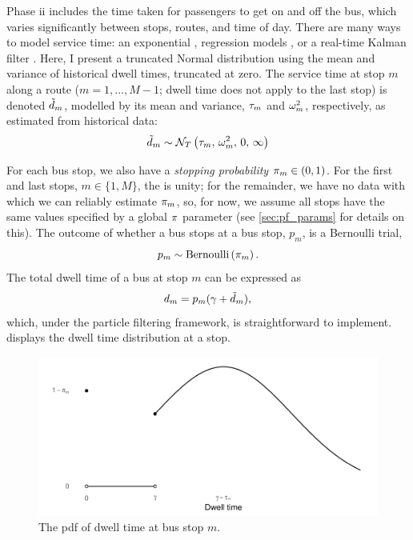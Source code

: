 Phase ii includes the time taken for passengers to get on and off the bus, which varies significantly between stops, routes, and time of day. There are many ways to model service time: an exponential \citep{Hans_2015}, regression models \citep{Shen_2013}, or a real-time Kalman filter \citep{Shalaby_2004}. Here, I present a truncated Normal distribution using the mean and variance of historical dwell times, truncated at zero. The service time at stop $m$ along a route ($m=1,...,M-1$; dwell time does not apply to the last stop) is denoted $\tilde d_m$, modelled by its mean and variance, $\tau_m$ and $\omega^2_m$, respectively, as estimated from historical data:
\begin{equation}
\label{eq:stop_dwell_time}
\tilde d_m \sim \mathcal{N}_T\left(\tau_m,\, \omega^2_m,\, 0,\, \infty\right)
\end{equation}

For each bus stop, we also have a \emph{stopping probability} $\pi_m\in(0,1)$. For the first and last stops, $m\in\{1,M\}$, the is unity; for the remainder, we have no data with which we can reliably estimate $\pi_m$, so, for now, we assume all stops have the same values specified by a global $\pi$ parameter (see \cref{sec:pf_params} for details on this). The outcome of whether a bus stops at a bus stop, $p_m$, is a Bernoulli trial,
\begin{equation}
\label{eq:stop_pstop}
p_m \sim \mathrm{Bernoulli}\left(\pi_m\right).
\end{equation}
The total dwell time of a bus at stop $m$ can be expressed as
\begin{equation}
\label{eq:stop_total_dwell_time}
d_m = p_m (\gamma + \tilde d_m),
\end{equation}
which, under the particle filtering framework, is straightforward to implement.  displays the dwell time distribution at a stop.


\begin{knitrout}\small
{}\color{fgcolor}\begin{figure}

{\centering \includegraphics[width=.8\textwidth]{figure/eta_dwell_times-1} 

}

\caption[The \gls{pdf} of dwell time at a stop]{The \gls{pdf} of dwell time at bus stop $m$.}\label{fig:eta_dwell_times}
\end{figure}


\end{knitrout}


